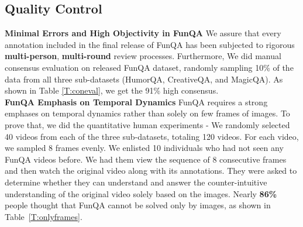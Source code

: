 \subsection{Quality Control}
\noindent\textbf{Minimal Errors and High Objectivity in FunQA}\quad
We assure that every annotation included in the final release of FunQA has been subjected to rigorous \textbf{multi-person}, \textbf{multi-round} review processes. Furthermore, We did manual consensus evaluation on released FunQA dataset, randomly sampling 10\% of the data from all three sub-datasets (HumorQA, CreativeQA, and MagicQA). As shown in Table \ref{T:coneval}, we get the 91\% high consensus.\\
\noindent\textbf{FunQA Emphasis on Temporal Dynamics}\quad
FunQA requires a strong emphases on temporal dynamics rather than solely on few frames of images. To prove that, we did the quantitative human experiments - We randomly selected 40 videos from each of the three sub-datasets, totaling 120 videos. For each video, we sampled 8 frames evenly. We enlisted 10 individuals who had not seen any FunQA videos before. We had them view the sequence of 8 consecutive frames and then watch the original video along with its annotations. They were asked to determine whether they can understand and answer the counter-intuitive understanding of the original video solely based on the images. Nearly \textbf{86\%} people thought that FunQA cannot be solved only by images, as shown in Table~\ref{T:onlyframes}.\\
% 
%

% 


